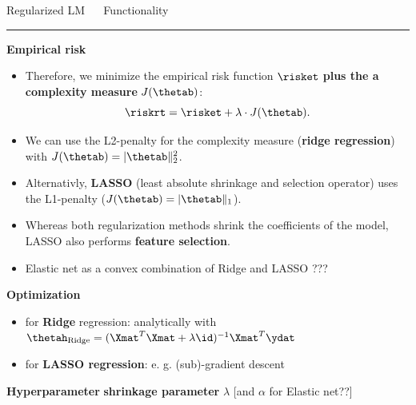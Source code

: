 \documentclass[11pt,compress,t,notes=noshow, xcolor=table]{beamer}
\begin{document}

\LARGE
\begin{frame}{\textcolor{gray!80}{Regularized LM} ~~ Functionality}
\normalsize
\vspace{-0.5cm}
\noindent \textcolor{gray!80}{\rule{\textwidth}{1pt}}

\vspace{0.3cm}




\footnotesize

\textbf{\textcolor{gray!80}{Empirical risk}}

\begin{itemize}

\item Therefore, we minimize the empirical risk function $\risket$ \textbf{plus the a complexity measure} $J(\thetab)$:
  $$
  \riskrt = \risket + \lambda \cdot J(\thetab). 
  $$ 
  
\item We can use the L2-penalty for the complexity measure (\textbf{ridge regression}) with $J(\thetab) = |\thetab\|_2^2 $. 

\item Alternativly, \textbf{LASSO} (least absolute shrinkage and selection operator) uses the L1-penalty ($J(\thetab) = |\thetab\|_1 $).

\item Whereas both regularization methods shrink the coefficients of the model, LASSO also performs \textbf{feature selection}. 

\item Elastic net as a convex combination of Ridge and LASSO ???
  
  
\end{itemize}





\medskip

\textbf{\textcolor{gray!80}{Optimization}} ~~
\begin{itemize}\footnotesize
  \item for \textbf{Ridge} regression: analytically with $\thetah_{\text{Ridge}} = (\Xmat^T \Xmat  + \lambda \id)^{-1} \Xmat^T\ydat$
  \item for \textbf{LASSO regression}: e. g. (sub)-gradient descent
\end{itemize}

\medskip

\textbf{\textcolor{gray!80}{Hyperparameter}} \textbf{shrinkage parameter} $\lambda$ [and $\alpha$ for Elastic net??]

\end{frame}
\end{document}
